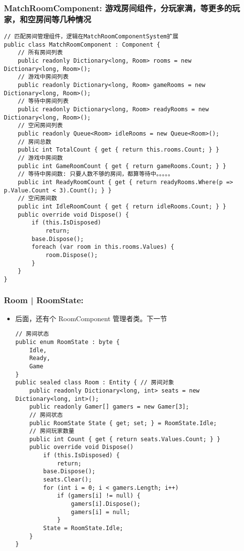 \documentclass[9pt, b5paper]{article}
\begin{document}
\subsubsection{MatchRoomComponent: 游戏房间组件，分玩家满，等更多的玩家，和空房间等几种情况}
\label{sec-1-4-1}
\begin{verbatim}
// 匹配房间管理组件，逻辑在MatchRoomComponentSystem扩展
public class MatchRoomComponent : Component {
    // 所有房间列表
    public readonly Dictionary<long, Room> rooms = new Dictionary<long, Room>();
    // 游戏中房间列表
    public readonly Dictionary<long, Room> gameRooms = new Dictionary<long, Room>();
    // 等待中房间列表
    public readonly Dictionary<long, Room> readyRooms = new Dictionary<long, Room>();
    // 空闲房间列表
    public readonly Queue<Room> idleRooms = new Queue<Room>();
    // 房间总数
    public int TotalCount { get { return this.rooms.Count; } }
    // 游戏中房间数
    public int GameRoomCount { get { return gameRooms.Count; } }
    // 等待中房间数: 只要人数不够的房间，都算等待中。。。。。
    public int ReadyRoomCount { get { return readyRooms.Where(p => p.Value.Count < 3).Count(); } }
    // 空闲房间数
    public int IdleRoomCount { get { return idleRooms.Count; } }
    public override void Dispose() {
        if (this.IsDisposed) 
            return;
        base.Dispose();
        foreach (var room in this.rooms.Values) {
            room.Dispose();
        }
    }
}
\end{verbatim}
\subsubsection{Room | RoomState:}
\label{sec-1-4-2}
\begin{itemize}
\item 后面，还有个 RoomComponent 管理者类。下一节
\begin{verbatim}
// 房间状态
public enum RoomState : byte {
    Idle,       
    Ready,      
    Game        
}
public sealed class Room : Entity { // 房间对象
    public readonly Dictionary<long, int> seats = new Dictionary<long, int>();
    public readonly Gamer[] gamers = new Gamer[3];
    // 房间状态
    public RoomState State { get; set; } = RoomState.Idle;
    // 房间玩家数量
    public int Count { get { return seats.Values.Count; } }
    public override void Dispose() 
        if (this.IsDisposed) {
            return;
        base.Dispose();
        seats.Clear();
        for (int i = 0; i < gamers.Length; i++) 
            if (gamers[i] != null) {
                gamers[i].Dispose();
                gamers[i] = null;
            }
        State = RoomState.Idle;
    }
}
\end{verbatim}
\end{itemize}
\end{document}
